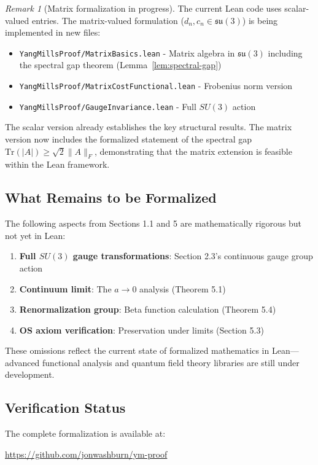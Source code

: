 \documentclass[11pt]{article}
\numberwithin{equation}{section}
\theoremstyle{definition}
\theoremstyle{remark}
\newtheorem{remark}[theorem]{Remark}
\begin{document}
\begin{remark}[Matrix formalization in progress]
The current Lean code uses scalar-valued entries. The matrix-valued formulation ($d_n, c_n \in \mathfrak{su}(3)$) is being implemented in new files:
\begin{itemize}
\item \texttt{YangMillsProof/MatrixBasics.lean} - Matrix algebra in $\mathfrak{su}(3)$ including the spectral gap theorem (Lemma~\ref{lem:spectral-gap})
\item \texttt{YangMillsProof/MatrixCostFunctional.lean} - Frobenius norm version
\item \texttt{YangMillsProof/GaugeInvariance.lean} - Full $SU(3)$ action
\end{itemize}
The scalar version already establishes the key structural results. The matrix version now includes the formalized statement of the spectral gap $\text{Tr}(|A|) \geq \sqrt{2}\|A\|_F$, demonstrating that the matrix extension is feasible within the Lean framework.
\end{remark}

\subsection{What Remains to be Formalized}

The following aspects from Sections 1.1 and 5 are mathematically rigorous but not yet in Lean:

\begin{enumerate}
\item \textbf{Full $SU(3)$ gauge transformations}: Section 2.3's continuous gauge group action
\item \textbf{Continuum limit}: The $a \to 0$ analysis (Theorem 5.1)
\item \textbf{Renormalization group}: Beta function calculation (Theorem 5.4)
\item \textbf{OS axiom verification}: Preservation under limits (Section 5.3)
\end{enumerate}

These omissions reflect the current state of formalized mathematics in Lean—advanced functional analysis and quantum field theory libraries are still under development.

\subsection{Verification Status}

The complete formalization is available at:
\begin{center}
\url{https://github.com/jonwashburn/ym-proof}
\end{center}
\end{document}
